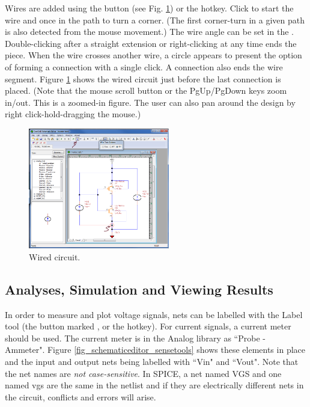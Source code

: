 {} Wires are added using the  button (see Fig. \ref{fig_schematiceditor_wiredtogether}) or the  hotkey.  Click to start the wire and once in the path to turn a corner.  (The first corner-turn in a given path is also detected from the mouse movement.) The wire angle can be set in the .  Double-clicking after a straight extension or right-clicking at any time ends the piece.  When the wire crosses another wire, a circle appears to present the option of forming a connection with a single click.  A connection also ends the wire segment. Figure \ref{fig_schematiceditor_wiredtogether} shows the wired circuit just before the last connection is placed. (Note that the mouse scroll button or the PgUp/PgDown keys zoom in/out. This is a zoomed-in figure. The user can also pan around the design by right click-hold-dragging the mouse.)  
\begin{figure}
    \includegraphics[width=0.55\textwidth]{./figures/getting_started_figures/SchematicEditor_addingwires.png}
    \caption{{Wired circuit.}}
  \label{fig_schematiceditor_wiredtogether}
\end{figure} 


%
\subsection{Analyses, Simulation and Viewing Results}

  In order to measure and plot voltage signals, nets can be labelled with the Label tool (the button marked , or the  hotkey).   For current signals, a current meter should be used.  The current meter is in the Analog library as ``Probe - Ammeter".  Figure \ref{fig_schematiceditor_sensetools} shows these elements in place and the input and output nets being labelled with \textsf{``Vin"} and \textsf{``Vout"}.  Note that the net names are \textit{not case-sensitive}. In SPICE, a net named \textsf{VGS} and one named \textsf{vgs} are the same in the netlist and if they are electrically different nets in the circuit, conflicts and errors will arise.  

